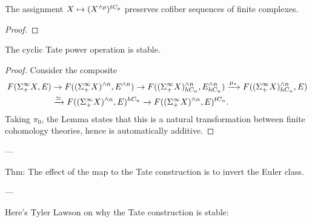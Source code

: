 \begin{lemma}
The assignment $X \mapsto (X^{\wedge p})^{tC_p}$ preserves cofiber sequences of finite complexes.
\end{lemma}
\begin{proof}
\end{proof}

\begin{corollary}
The cyclic Tate power operation is stable.
\end{corollary}
\begin{proof}
Consider the composite
\begin{align*}
F(\Sigma^\infty_+ X, E) & \to F((\Sigma^\infty_+ X)^{\wedge n}, E^{\wedge n}) \to F((\Sigma^\infty_+ X)^{\wedge n}_{hC_n}, E^{\wedge n}_{hC_n}) \xrightarrow{\mu_*} F((\Sigma^\infty_+ X)^{\wedge n}_{hC_n}, E) \\
& \xrightarrow{\simeq} F((\Sigma^\infty_+ X)^{\wedge n}, E)^{hC_n} \to F((\Sigma^\infty_+ X)^{\wedge n}, E)^{tC_n}.
\end{align*}
Taking $\pi_0$, the Lemma states that this is a natural transformation between finite cohomology theories, hence is automatically additive.
\end{proof}


---


Thm: The effect of the map to the Tate construction is to invert the Euler class.


---


Here's Tyler Lawson on why the Tate construction is stable:


